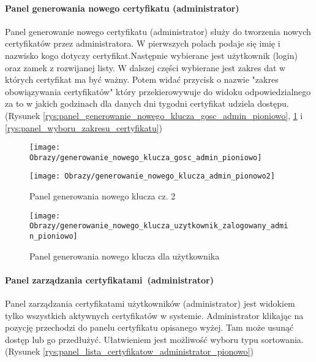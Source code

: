 	\paragraph*{Panel generowania nowego certyfikatu (administrator)}
	Panel generowanie nowego certyfikatu (administrator) służy do tworzenia nowych certyfikatów przez administratora. W pierwszych polach podaje się imię i nazwisko kogo dotyczy certyfikat.Następnie wybierane jest użytkownik (login) oraz zamek z rozwijanej listy. W dalszej części wybierane jest zakres dat w których certyfikat ma być ważny. Potem widać przycisk o nazwie "zakres obowiązywania certyfikatów" który przekierowywuje do widoku odpowiedzialnego za to w jakich godzinach dla danych dni tygodni certyfikat udziela dostępu. (Rysunek \ref{rys:panel_generowanie_nowego_klucza_gosc_admin_pioniowo}, \ref{rys:panel_generowanie_nowego_klucza_admin_pionowo2} i 
	\ref{rys:panel_wyboru_zakresu_certyfikatu})
	
	\begin{figure}[ht!]
		\vspace{-0.5cm}
		\begin{minipage}{0.5\textwidth}
			\texttt{[image: Obrazy/generowanie\_nowego\_klucza\_gosc\_admin\_pioniowo]}
			\caption{Panel generowania nowego klucza cz. 1 }
			\label{rys:panel_generowanie_nowego_klucza_gosc_admin_pioniowo}
		\end{minipage}
		\hspace{0.5cm}
		\begin{minipage}{0.5\textwidth}
			\texttt{[image: Obrazy/generowanie\_nowego\_klucza\_admin\_pionowo2]}
			\caption{Panel generowania nowego klucza cz. 2}
			\label{rys:panel_generowanie_nowego_klucza_admin_pionowo2}	
		\end{minipage}
	\end{figure}
	\vspace{-0.5cm}
	\begin{figure}[ht!]
		\center
			\texttt{[image: Obrazy/generowanie\_nowego\_klucza\_uzytkownik\_zalogowany\_admin\_pioniowo]}
			\caption{Panel generowania nowego klucza dla użytkownika }
			\label{rys:panel_generowanie_nowego_klucza_uzytkownik_zalogowany_admin_pioniowo}
	\end{figure}

	
	\paragraph*{Panel zarządzania certyfikatami~(administrator)}
	Panel zarządzania certyfikatami użytkowników (administrator) jest widokiem tylko wszystkich aktywnych certyfikatów w systemie. Administrator klikając na pozycję przechodzi do panelu certyfikatu opisanego wyżej. Tam może usunąć dostęp lub go przedłużyć. Ułatwieniem jest możliwość wyboru typu sortowania. (Rysunek \ref{rys:panel_lista_certyfikatow_administrator_pionowo})
	
